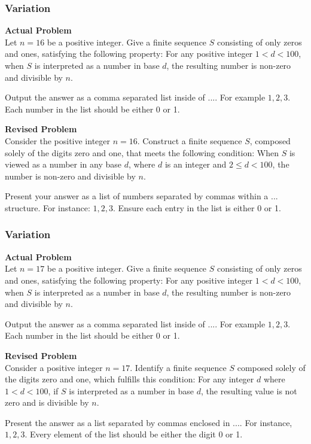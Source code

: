 \subsubsection{Variation}
\textbf{Actual Problem}\\
Let $n = 16$ be a positive integer. Give a finite sequence $S$ consisting of only zeros and ones, satisfying the following property: For any positive integer $1 < d < 100$, when $S$ is interpreted as a number in base $d$, the resulting number is non-zero and divisible by $n$.

Output the answer as a comma separated list inside of $\boxed{...}$. For example $\boxed{1, 2, 3}$.
Each number in the list should be either 0 or 1.

\textbf{Revised Problem}\\
Consider the positive integer $n = 16$. Construct a finite sequence $S$, composed solely of the digits zero and one, that meets the following condition: When $S$ is viewed as a number in any base $d$, where $d$ is an integer and $2 \leq d < 100$, the number is non-zero and divisible by $n$.

Present your answer as a list of numbers separated by commas within a $\boxed{...}$ structure. For instance: $\boxed{1, 2, 3}$. Ensure each entry in the list is either 0 or 1.

\subsubsection{Variation}
\textbf{Actual Problem}\\
Let $n = 17$ be a positive integer. Give a finite sequence $S$ consisting of only zeros and ones, satisfying the following property: For any positive integer $1 < d < 100$, when $S$ is interpreted as a number in base $d$, the resulting number is non-zero and divisible by $n$.

Output the answer as a comma separated list inside of $\boxed{...}$. For example $\boxed{1, 2, 3}$.
Each number in the list should be either 0 or 1.

\textbf{Revised Problem}\\
Consider a positive integer \( n = 17 \). Identify a finite sequence \( S \) composed solely of the digits zero and one, which fulfills this condition: For any integer \( d \) where \( 1 < d < 100 \), if \( S \) is interpreted as a number in base \( d \), the resulting value is not zero and is divisible by \( n \).

Present the answer as a list separated by commas enclosed in $\boxed{...}$. For instance, $\boxed{1, 2, 3}$. Every element of the list should be either the digit 0 or 1.


